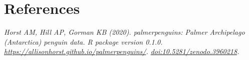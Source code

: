 \documentclass[]{article}
\begin{document}
\hypertarget{references}{%
\section{References}\label{references}}

\emph{Horst AM, Hill AP, Gorman KB (2020). palmerpenguins: Palmer
Archipelago (Antarctica) penguin data. R package version 0.1.0.
\url{https://allisonhorst.github.io/palmerpenguins/}.
\url{doi:10.5281/zenodo.3960218}.}

\vspace{-2pc}
\setlength{\parindent}{-0.5in}
\setlength{\leftskip}{-1in}
\setlength{\parskip}{8pt}

\noindent
\end{document}
